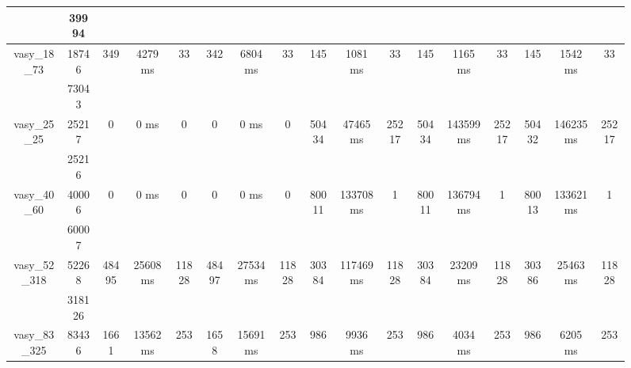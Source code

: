 \documentclass[../master/master.tex]{subfiles}
\begin{document}
\begin{figure}
\begin{tabular}{ |c|c||c|c|c||c|c|c||c|c|c||c|c|c||c|c|c| }
\cline{2-2}
 & 39994  &  &  &  &  &  &  &  &  &  &  &  &  &  &  &  \\
\hline
\multirow{2}{4em}{vasy\_18\_73} & 18746 & \multirow{2}{4em}{349} & \multirow{2}{4em}{4279 ms} & \multirow{2}{4em}{33} & \multirow{2}{4em}{342} & \multirow{2}{4em}{6804 ms} & \multirow{2}{4em}{33} & \multirow{2}{4em}{145} & \multirow{2}{4em}{1081 ms} & \multirow{2}{4em}{33} & \multirow{2}{4em}{145} & \multirow{2}{4em}{1165 ms} & \multirow{2}{4em}{33} & \multirow{2}{4em}{145} & \multirow{2}{4em}{1542 ms} & \multirow{2}{4em}{33} \\
\cline{2-2}
 & 73043  &  &  &  &  &  &  &  &  &  &  &  &  &  &  &  \\
\hline
\multirow{2}{4em}{vasy\_25\_25} & 25217 & \multirow{2}{4em}{0} & \multirow{2}{4em}{0 ms} & \multirow{2}{4em}{0} & \multirow{2}{4em}{0} & \multirow{2}{4em}{0 ms} & \multirow{2}{4em}{0} & \multirow{2}{4em}{50434} & \multirow{2}{4em}{47465 ms} & \multirow{2}{4em}{25217} & \multirow{2}{4em}{50434} & \multirow{2}{4em}{143599 ms} & \multirow{2}{4em}{25217} & \multirow{2}{4em}{50432} & \multirow{2}{4em}{146235 ms} & \multirow{2}{4em}{25217} \\
\cline{2-2}
 & 25216  &  &  &  &  &  &  &  &  &  &  &  &  &  &  &  \\
\hline
\multirow{2}{4em}{vasy\_40\_60} & 40006 & \multirow{2}{4em}{0} & \multirow{2}{4em}{0 ms} & \multirow{2}{4em}{0} & \multirow{2}{4em}{0} & \multirow{2}{4em}{0 ms} & \multirow{2}{4em}{0} & \multirow{2}{4em}{80011} & \multirow{2}{4em}{133708 ms} & \multirow{2}{4em}{1} & \multirow{2}{4em}{80011} & \multirow{2}{4em}{136794 ms} & \multirow{2}{4em}{1} & \multirow{2}{4em}{80013} & \multirow{2}{4em}{133621 ms} & \multirow{2}{4em}{1} \\
\cline{2-2}
 & 60007  &  &  &  &  &  &  &  &  &  &  &  &  &  &  &  \\
\hline
\multirow{2}{4em}{vasy\_52\_318} & 52268 & \multirow{2}{4em}{48495} & \multirow{2}{4em}{25608 ms} & \multirow{2}{4em}{11828} & \multirow{2}{4em}{48497} & \multirow{2}{4em}{27534 ms} & \multirow{2}{4em}{11828} & \multirow{2}{4em}{30384} & \multirow{2}{4em}{117469 ms} & \multirow{2}{4em}{11828} & \multirow{2}{4em}{30384} & \multirow{2}{4em}{23209 ms} & \multirow{2}{4em}{11828} & \multirow{2}{4em}{30386} & \multirow{2}{4em}{25463 ms} & \multirow{2}{4em}{11828} \\
\cline{2-2}
 & 318126  &  &  &  &  &  &  &  &  &  &  &  &  &  &  &  \\
\hline
\multirow{2}{4em}{vasy\_83\_325} & 83436 & \multirow{2}{4em}{1661} & \multirow{2}{4em}{13562 ms} & \multirow{2}{4em}{253} & \multirow{2}{4em}{1658} & \multirow{2}{4em}{15691 ms} & \multirow{2}{4em}{253} & \multirow{2}{4em}{986} & \multirow{2}{4em}{9936 ms} & \multirow{2}{4em}{253} & \multirow{2}{4em}{986} & \multirow{2}{4em}{4034 ms} & \multirow{2}{4em}{253} & \multirow{2}{4em}{986} & \multirow{2}{4em}{6205 ms} & \multirow{2}{4em}{253} \\

\end{tabular}
\end{figure}
\end{document}
